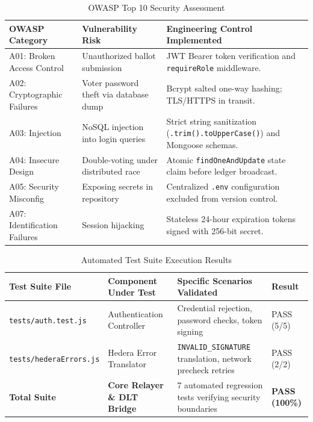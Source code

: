 \documentclass[12pt, a4paper]{article}
\begin{document}
\begin{table}[H]
    \centering
    \caption{OWASP Top 10 Security Assessment}
    \label{tab:owasp}
    \begin{tabularx}{\textwidth}{@{}l X X@{}}
        \toprule
        \textbf{OWASP Category} & \textbf{Vulnerability Risk} & \textbf{Engineering Control Implemented} \\
        \midrule
        A01: Broken Access Control & Unauthorized ballot submission & JWT Bearer token verification and \texttt{requireRole} middleware. \\
        A02: Cryptographic Failures & Voter password theft via database dump & Bcrypt salted one-way hashing; TLS/HTTPS in transit. \\
        A03: Injection & NoSQL injection into login queries & Strict string sanitization (\texttt{.trim().toUpperCase()}) and Mongoose schemas. \\
        A04: Insecure Design & Double-voting under distributed race & Atomic \texttt{findOneAndUpdate} state claim before ledger broadcast. \\
        A05: Security Misconfig & Exposing secrets in repository & Centralized \texttt{.env} configuration excluded from version control. \\
        A07: Identification Failures & Session hijacking & Stateless 24-hour expiration tokens signed with 256-bit secret. \\
        \bottomrule
    \end{tabularx}
\end{table}

\begin{table}[H]
    \centering
    \caption{Automated Test Suite Execution Results}
    \label{tab:tests}
    \begin{tabularx}{\textwidth}{@{}l X X l@{}}
        \toprule
        \textbf{Test Suite File} & \textbf{Component Under Test} & \textbf{Specific Scenarios Validated} & \textbf{Result} \\
        \midrule
        \texttt{tests/auth.test.js} & Authentication Controller & Credential rejection, password checks, token signing & PASS (5/5) \\
        \texttt{tests/hederaErrors.js} & Hedera Error Translator & \texttt{INVALID\_SIGNATURE} translation, network precheck retries & PASS (2/2) \\
        \textbf{Total Suite} & \textbf{Core Relayer \& DLT Bridge} & 7 automated regression tests verifying security boundaries & \textbf{PASS (100\%)} \\
        \bottomrule
    \end{tabularx}
\end{table}
\end{document}
